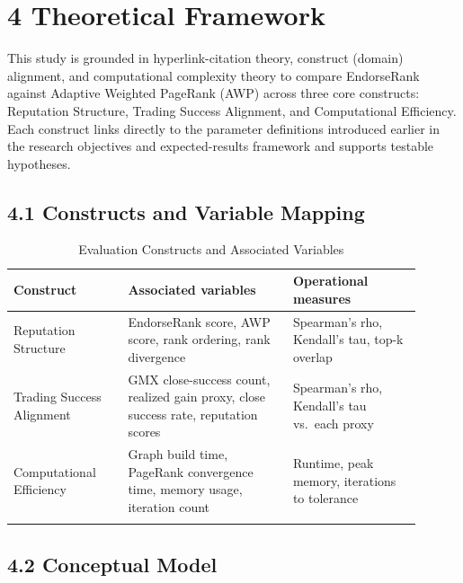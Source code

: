 \clearpage
{}
\section*{4 \textbf{Theoretical Framework}}
\label{sec:theoretical-framework}

This study is grounded in hyperlink-citation theory, construct (domain) alignment, and computational complexity theory to compare EndorseRank against Adaptive Weighted PageRank (AWP) across three core constructs: Reputation Structure, Trading Success Alignment, and Computational Efficiency. Each construct links directly to the parameter definitions introduced earlier in the research objectives and expected-results framework and supports testable hypotheses.


\subsection*{4.1 Constructs and Variable Mapping}
\label{sec:constructs-and-variable-mapping}

\begin{longtable}{>{\raggedright\arraybackslash}p{0.25\linewidth}>{\raggedright\arraybackslash}p{0.36\linewidth}>{\raggedright\arraybackslash}p{0.29\linewidth}}
\caption{Evaluation Constructs and Associated Variables}\\
\toprule
\textbf{Construct} & \textbf{Associated variables} & \textbf{Operational measures} \\
\midrule
Reputation Structure & EndorseRank score, AWP score, rank ordering, rank divergence & Spearman's rho, Kendall's tau, top-k overlap \\
\addlinespace
Trading Success Alignment & GMX close-success count, realized gain proxy, close success rate, reputation scores & Spearman's rho, Kendall's tau vs.\ each proxy \\
\addlinespace
Computational Efficiency & Graph build time, PageRank convergence time, memory usage, iteration count & Runtime, peak memory, iterations to tolerance \\
\addlinespace
\bottomrule
\end{longtable}

\subsection*{4.2 Conceptual Model}
\label{sec:conceptual-model}

